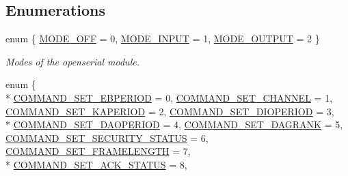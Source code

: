 \subsection*{Enumerations}
\begin{DoxyCompactItemize}
\item 
enum \{ \hyperlink{group___open_serial_gga1812ab31015cef0a41c6d4f3ae07f13da4490f51e1ae54eaeb72eb72c49e1a077}{M\+O\+D\+E\+\_\+\+O\+FF} = 0, 
\hyperlink{group___open_serial_gga1812ab31015cef0a41c6d4f3ae07f13da4f139294c29235db806091c9383a3ba1}{M\+O\+D\+E\+\_\+\+I\+N\+P\+UT} = 1, 
\hyperlink{group___open_serial_gga1812ab31015cef0a41c6d4f3ae07f13da3bc21d107b4e0b5a7387181360485a34}{M\+O\+D\+E\+\_\+\+O\+U\+T\+P\+UT} = 2
 \}\begin{DoxyCompactList}\small\item\em Modes of the openserial module. \end{DoxyCompactList}
\item 
enum \{ \\*
\hyperlink{group___open_serial_gga0a28cf10bf72f80c90de5e5e1e698bfbaabd826f40f7b4efa5b4951313efd8c17}{C\+O\+M\+M\+A\+N\+D\+\_\+\+S\+E\+T\+\_\+\+E\+B\+P\+E\+R\+I\+OD} = 0, 
\hyperlink{group___open_serial_gga0a28cf10bf72f80c90de5e5e1e698bfba72ac8e2e43101b38d5db9fd7d0712776}{C\+O\+M\+M\+A\+N\+D\+\_\+\+S\+E\+T\+\_\+\+C\+H\+A\+N\+N\+EL} = 1, 
\hyperlink{group___open_serial_gga0a28cf10bf72f80c90de5e5e1e698bfba2bd12cd023f976d3c5f89e980d8ad083}{C\+O\+M\+M\+A\+N\+D\+\_\+\+S\+E\+T\+\_\+\+K\+A\+P\+E\+R\+I\+OD} = 2, 
\hyperlink{group___open_serial_gga0a28cf10bf72f80c90de5e5e1e698bfbada7240bdcd5edb003f6d34aef8f8b497}{C\+O\+M\+M\+A\+N\+D\+\_\+\+S\+E\+T\+\_\+\+D\+I\+O\+P\+E\+R\+I\+OD} = 3, 
\\*
\hyperlink{group___open_serial_gga0a28cf10bf72f80c90de5e5e1e698bfbab220f6359d4160bd77d0e9097ddd7b82}{C\+O\+M\+M\+A\+N\+D\+\_\+\+S\+E\+T\+\_\+\+D\+A\+O\+P\+E\+R\+I\+OD} = 4, 
\hyperlink{group___open_serial_gga0a28cf10bf72f80c90de5e5e1e698bfbabdcb46bd9c3dc4467e4202622fb6ecb7}{C\+O\+M\+M\+A\+N\+D\+\_\+\+S\+E\+T\+\_\+\+D\+A\+G\+R\+A\+NK} = 5, 
\hyperlink{group___open_serial_gga0a28cf10bf72f80c90de5e5e1e698bfba0ae6e168c73e2377aea764a82f61b07b}{C\+O\+M\+M\+A\+N\+D\+\_\+\+S\+E\+T\+\_\+\+S\+E\+C\+U\+R\+I\+T\+Y\+\_\+\+S\+T\+A\+T\+US} = 6, 
\hyperlink{group___open_serial_gga0a28cf10bf72f80c90de5e5e1e698bfba8fcfe381c4753856e629a927d5ed1d33}{C\+O\+M\+M\+A\+N\+D\+\_\+\+S\+E\+T\+\_\+\+F\+R\+A\+M\+E\+L\+E\+N\+G\+TH} = 7, 
\\*
\hyperlink{group___open_serial_gga0a28cf10bf72f80c90de5e5e1e698bfbad77db733930ad442b47757e3dcd67721}{C\+O\+M\+M\+A\+N\+D\+\_\+\+S\+E\+T\+\_\+\+A\+C\+K\+\_\+\+S\+T\+A\+T\+US} = 8, 

\end{DoxyCompactItemize}
